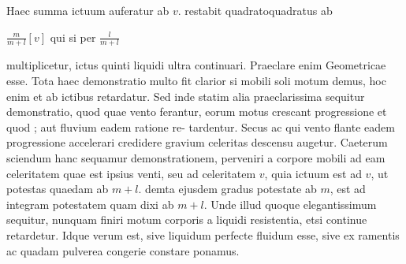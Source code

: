 \rule[-4mm]{0mm}{10mm} Haec summa ictuum auferatur ab $\displaystyle v.$
restabit quadratoquadratus ab \rule[-4mm]{0mm}{10mm}$\displaystyle \frac{m}{m + l}[v]$
qui si per $\displaystyle \frac{l}{m + l}$ \rule[-4mm]{0mm}{8mm}multiplicetur, ictus quinti liquidi 
ultra continuari. Praeclare enim 
Geometricae esse.
\pend
\count{}
\pstart
Tota haec demonstratio multo fit clarior si mobili soli motum demus, hoc enim et ab ictibus retardatur. Sed inde statim alia praeclarissima sequitur demonstratio, quod quae vento 
ferantur, eorum motus crescant progressione 
et quod ;
aut fluvium eadem ratione re-
\pend
\newpage
\pstart\noindent tardentur. Secus ac  qui vento flante eadem progressione accelerari credidere 
gravium\protect{} celeritas descensu augetur. Caeterum sciendum 
hanc sequamur demonstrationem, 
perveniri a corpore mobili ad eam celeritatem quae est ipsius venti, seu ad celeritatem $\displaystyle v$, quia 
ictuum est ad $\displaystyle v$, ut potestas quaedam ab $\displaystyle m + l$. demta ejusdem gradus potestate ab $\displaystyle m$, est ad integram potestatem quam dixi ab $\displaystyle m + l$.
Unde illud quoque elegantissimum sequitur, nunquam finiri motum corporis a liquidi resistentia\protect{}, etsi continue retardetur. Idque verum est, sive liquidum perfecte fluidum esse, sive ex ramentis ac quadam pulverea congerie constare ponamus.
